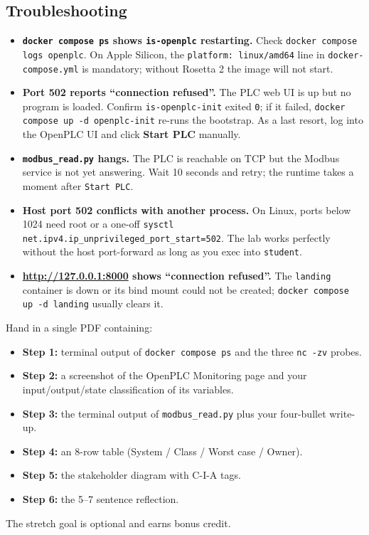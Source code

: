 \documentclass[11pt,a4paper]{article}
\begin{document}
\subsection*{Troubleshooting}
\begin{itemize}\setlength{\itemsep}{1pt}
  \item \textbf{\texttt{docker compose ps} shows \texttt{is-openplc}
        restarting.} Check \texttt{docker compose logs openplc}. On
        Apple Silicon, the \texttt{platform: linux/amd64} line in
        \texttt{docker-compose.yml} is mandatory; without Rosetta 2
        the image will not start.
  \item \textbf{Port 502 reports ``connection refused''.} The PLC web
        UI is up but no program is loaded. Confirm
        \texttt{is-openplc-init} exited \texttt{0}; if it failed,
        \texttt{docker compose up -d openplc-init} re-runs the
        bootstrap. As a last resort, log into the OpenPLC UI and click
        \textbf{Start PLC} manually.
  \item \textbf{\texttt{modbus\_read.py} hangs.} The PLC is reachable
        on TCP but the Modbus service is not yet answering. Wait 10
        seconds and retry; the runtime takes a moment after
        \texttt{Start PLC}.
  \item \textbf{Host port 502 conflicts with another process.} On
        Linux, ports below 1024 need root or a one-off
        \texttt{sysctl net.ipv4.ip\_unprivileged\_port\_start=502}.
        The lab works perfectly without the host port-forward as long
        as you exec into \texttt{student}.
  \item \textbf{\url{http://127.0.0.1:8000} shows ``connection
        refused''.} The \texttt{landing} container is down or its bind
        mount could not be created; \texttt{docker compose up -d
        landing} usually clears it.
\end{itemize}

\begin{deliverbox}
Hand in a single PDF containing:
\begin{itemize}\setlength{\itemsep}{1pt}
  \item \textbf{Step 1:} terminal output of \texttt{docker compose ps}
        and the three \texttt{nc -zv} probes.
  \item \textbf{Step 2:} a screenshot of the OpenPLC Monitoring page
        and your input/output/state classification of its variables.
  \item \textbf{Step 3:} the terminal output of \texttt{modbus\_read.py}
        plus your four-bullet write-up.
  \item \textbf{Step 4:} an 8-row table (System / Class / Worst case
        / Owner).
  \item \textbf{Step 5:} the stakeholder diagram with C-I-A tags.
  \item \textbf{Step 6:} the 5--7 sentence reflection.
\end{itemize}
The stretch goal is optional and earns bonus credit.
\end{deliverbox}
\end{document}
